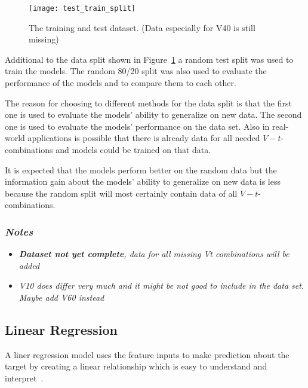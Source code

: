 \begin{figure}[H]
    \begin{tcolorbox}[arc=0pt,boxrule=0.5pt]
        \centering
        \texttt{[image: test\_train\_split]}
        \caption{The training and test dataset. (Data especially for V40 is still missing)}
        \label{fig:train_test_split}
    \end{tcolorbox}
\end{figure}

Additional to the data split shown in Figure~\ref{fig:train_test_split} a random test split was
used to train the
models. The random 80/20 split was also used to evaluate the performance of the models and to
compare them to each
other.

The reason for choosing to different methods for the data split is that the first one is used to
evaluate the models'
ability to generalize on new data. The second one is used to evaluate the models' performance on
the data set.
Also in real-world applications is possible that there is already data for all needed
$V-t$-combinations and models
could be trained on that data.

It is expected that the models perform better on the random data but the information gain about
the models' ability
to generalize on new data is less because the random split will most certainly contain data of
all $V-t$-combinations.


\subsubsection*{\textit{Notes}}
\begin{itemize}
    \item \textit{\textbf{Dataset not yet complete}, data for all missing Vt combinations will be
    added}
    \item \textit{V10 does differ very much and it might be not good to include in the data set.
    Maybe add V60 instead}
\end{itemize}

\subsection{Linear Regression}\label{subsec:linear-regression}
A liner regression model uses the feature inputs to make prediction about the target by
creating a linear relationship which is easy to understand and interpret~\cite[p.
37]{molnar2020interpretable}.

